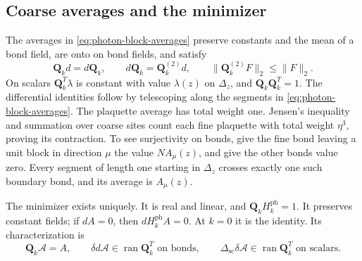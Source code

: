 \subsection{Coarse averages and the minimizer}\label{subsec:photon-Landau-minimizer}
The averages in \eqref{eq:photon-block-averages} preserve
constants and the mean of a bond field, are onto on bond fields, and
satisfy
\begin{equation}\label{eq:photon-averaging-identities}
 \mathbf Q_kd=d\mathbf Q_k,\qquad
 d\mathbf Q_k=\mathbf Q_k^{(2)}d,\qquad
 \|\mathbf Q_k^{(2)}F\|_2\le\|F\|_2.
\end{equation}
On scalars $\mathbf Q_k^T\lambda$ is constant with value $\lambda(z)$
on $\Delta_z$, and $\mathbf Q_k\mathbf Q_k^T=1$.
The differential identities follow by telescoping along the segments
in \eqref{eq:photon-block-averages}. The plaquette average has total
weight one. Jensen's inequality and summation over coarse sites count
each fine plaquette with total weight $\eta^3$, proving its contraction.
To see surjectivity on bonds, give the fine bond leaving a unit block
in direction $\mu$ the value $N A_\mu(z)$, and give the other bonds
value zero. Every segment of length one starting in $\Delta_z$ crosses
exactly one such boundary bond, and its average is $A_\mu(z)$.

\begin{proposition}\label{prop:photon-Landau-minimizer}
The minimizer exists uniquely. It is real and linear, and
$\mathbf Q_kH_k^{\mathrm{ph}}=1$. It preserves constant fields;
if $dA=0$, then $dH_k^{\mathrm{ph}}A=0$. At $k=0$ it is the identity.
Its characterization is
\begin{equation}\label{eq:photon-minimizer-Euler}
 \mathbf Q_k\mathscr A=A,\qquad
 \delta d\mathscr A\in\operatorname{ran}\mathbf Q_k^T
     \text{ on bonds},\qquad
 \Delta_{\mathrm{sc}}\delta\mathscr A
      \in\operatorname{ran}\mathbf Q_k^T\text{ on scalars}.
\end{equation}
\end{proposition}

